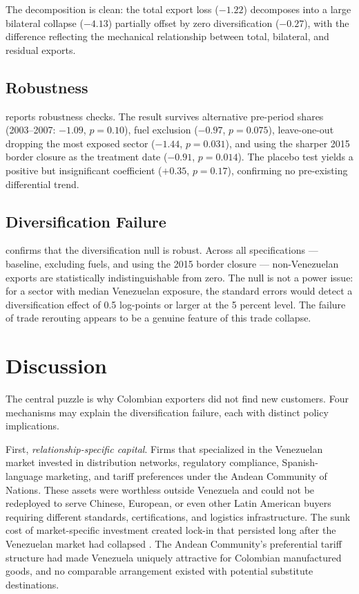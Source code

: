 \documentclass[12pt]{article}
\begin{document}
The decomposition is clean: the total export loss ($-1.22$) decomposes into a large bilateral collapse ($-4.13$) partially offset by zero diversification ($-0.27$), with the difference reflecting the mechanical relationship between total, bilateral, and residual exports.

\subsection{Robustness}



 reports robustness checks. The result survives alternative pre-period shares (2003--2007: $-1.09$, $p = 0.10$), fuel exclusion ($-0.97$, $p = 0.075$), leave-one-out dropping the most exposed sector ($-1.44$, $p = 0.031$), and using the sharper 2015 border closure as the treatment date ($-0.91$, $p = 0.014$). The placebo test yields a positive but insignificant coefficient ($+0.35$, $p = 0.17$), confirming no pre-existing differential trend.

\subsection{Diversification Failure}



 confirms that the diversification null is robust. Across all specifications --- baseline, excluding fuels, and using the 2015 border closure --- non-Venezuelan exports are statistically indistinguishable from zero. The null is not a power issue: for a sector with median Venezuelan exposure, the standard errors would detect a diversification effect of 0.5 log-points or larger at the 5 percent level. The failure of trade rerouting appears to be a genuine feature of this trade collapse.

\section{Discussion}

The central puzzle is why Colombian exporters did not find new customers. Four mechanisms may explain the diversification failure, each with distinct policy implications.

First, \emph{relationship-specific capital}. Firms that specialized in the Venezuelan market invested in distribution networks, regulatory compliance, Spanish-language marketing, and tariff preferences under the Andean Community of Nations. These assets were worthless outside Venezuela and could not be redeployed to serve Chinese, European, or even other Latin American buyers requiring different standards, certifications, and logistics infrastructure. The sunk cost of market-specific investment created lock-in that persisted long after the Venezuelan market had collapsed \citep{chaney2014network}. The Andean Community's preferential tariff structure had made Venezuela uniquely attractive for Colombian manufactured goods, and no comparable arrangement existed with potential substitute destinations.
\end{document}
